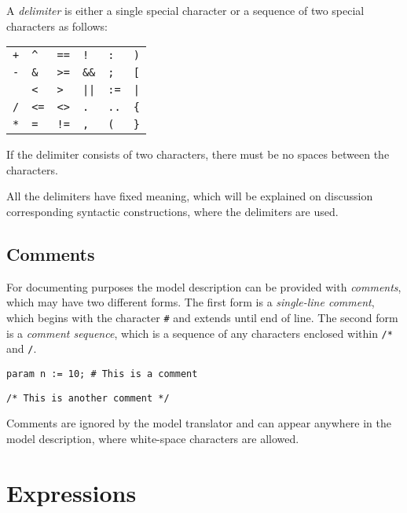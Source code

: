 \documentclass[10pt]{article}
\begin{document}
A {\it delimiter} is either a single special character or a sequence of
two special characters as follows:

\medskip

\noindent\hfil
\begin{tabular}{@{}p{.3in}p{.3in}p{.3in}p{.3in}p{.3in}p{.3in}@{}}
{\tt+}&{\tt\textasciicircum}&{\tt==}&{\tt!}&{\tt:}&{\tt)}\\
{\tt-}&{\tt\&}&{\tt>=}&{\tt\&\&}&{\tt;}&{\tt[}\\
{\tt*}&{\tt<}&{\tt>}&{\tt||}&{\tt:=}&{\tt|}\\
{\tt/}&{\tt<=}&{\tt<>}&{\tt.}&{\tt..}&{\tt\{}\\
{\tt**}&{\tt=}&{\tt!=}&{\tt,}&{\tt(}&{\tt\}}\\
\end{tabular}

\medskip

If the delimiter consists of two characters, there must be no spaces
between the characters.

All the delimiters have fixed meaning, which will be explained on
discussion corresponding syntactic constructions, where the delimiters
are used.

\subsection{Comments}

For documenting purposes the model description can be provided with
{\it comments}, which may have two different forms. The first form is
a {\it single-line comment}, which begins with the character {\tt\#}
and extends until end of line. The second form is a {\it comment
sequence}, which is a sequence of any characters enclosed within
{\tt/*} and {\tt*/}.

\medskip


\medskip

\noindent\verb|param n := 10; # This is a comment|

\noindent\verb|/* This is another comment */|

\medskip

Comments are ignored by the model translator and can appear anywhere in
the model description, where white-space characters are allowed.


\newpage

\section{Expressions}
\end{document}
